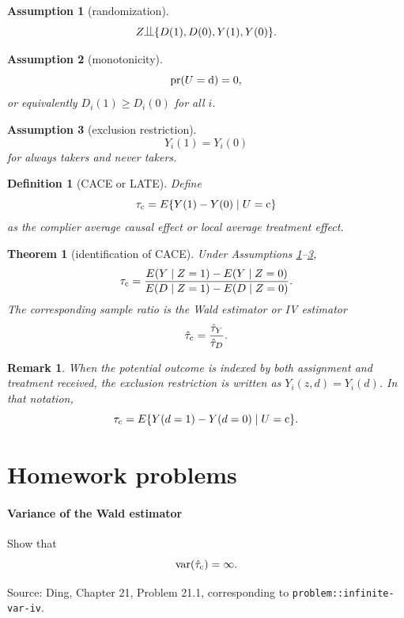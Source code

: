 \documentclass[krantz1]{krantz}
\newcommand{\ri}[1]{\lstinline{#1}}
\newtheorem{assumption}{Assumption}
\newtheorem{remark}{Remark}
\newtheorem{theorem}{Theorem}
\newtheorem{definition}{Definition}
\def\ind{\begin{picture}(9,8)
         \put(0,0){\line(1,0){9}}
         \put(3,0){\line(0,1){8}}
         \put(6,0){\line(0,1){8}}
         \end{picture}
        }
\def\var{\textup{var}}
\def\pr{\textup{pr}}
\def\cp{\textup{c}}
\def\df{\textup{d}}
\begin{document}
\begin{assumption}[randomization]\label{assume::random-hw}
\[
Z\ind \{D(1),D(0),Y(1),Y(0)\}.
\]
\end{assumption}

\begin{assumption}[monotonicity]\label{assume::Mono-hw}
\[
\pr(U=\df)=0,
\]
or equivalently \(D_i(1)\geq D_i(0)\) for all \(i\).
\end{assumption}

\begin{assumption}[exclusion restriction]\label{assume::ER-hw}
\[
Y_i(1)=Y_i(0)
\]
for always takers and never takers.
\end{assumption}

\begin{definition}[CACE or LATE]\label{def::CACE-hw}
Define
\[
\tau_\cp
=
E\{Y(1)-Y(0)\mid U=\cp\}
\]
as the complier average causal effect or local average treatment effect.
\end{definition}

\begin{theorem}[identification of CACE]\label{thm::CACE-identification-hw}
Under Assumptions \ref{assume::random-hw}--\ref{assume::ER-hw},
\[
\tau_\cp
=
\frac{E(Y\mid Z=1)-E(Y\mid Z=0)}
{E(D\mid Z=1)-E(D\mid Z=0)}.
\]
The corresponding sample ratio is the Wald estimator or IV estimator
\[
\hat\tau_\cp=\frac{\hat\tau_Y}{\hat\tau_D}.
\]
\end{theorem}

\begin{remark}
When the potential outcome is indexed by both assignment and treatment received,
the exclusion restriction is written as \(Y_i(z,d)=Y_i(d)\). In that notation,
\[
\tau_\cp=E\{Y(d=1)-Y(d=0)\mid U=\cp\}.
\]
\end{remark}

\section{Homework problems}

\paragraph{Variance of the Wald estimator}\label{problem::infinite-var-iv-hw}

Show that
\[
\var(\hat{\tau}_\cp)=\infty.
\]

Source: Ding, Chapter 21, Problem 21.1, corresponding to
\ri{problem::infinite-var-iv}.
\end{document}
